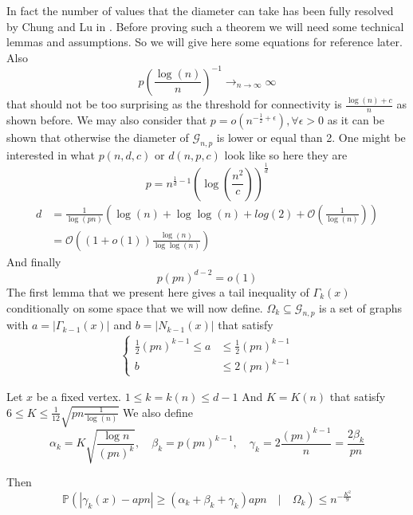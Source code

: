 In fact the number of values that the diameter can take has been fully resolved by Chung and Lu in \cite{ChungLu01}.
\newline
Before proving such a theorem we will need some technical lemmas and assumptions. So we will give here some equations for reference later.
Also 
\begin{equation}
	p (\frac{\log(n)}{n})^{-1} \longrightarrow_{n \to \infty} \infty
\end{equation}
that should not be too surprising as the threshold for connectivity is $\frac{\log(n) + c}{n}$ as shown before.
We may also consider that $p = o(n^{-\frac{1}{2} +\epsilon}), \forall \epsilon > 0$ as it can be shown that otherwise the diameter of $\mathcal{G}_{n,p}$ is lower or equal than 2. One might be interested in what $p(n, d, c)$ or $d(n , p, c)$ look like so here they are
\begin{equation}
	p=n^{\frac{1}{d} - 1}(\log(\frac{n^2}{c}))^\frac{1}{d}
\end{equation}
\begin{align}\label{eq:pnd}
	d &= \frac{1}{\log(pn)}(\log(n) + \log \log (n) + log(2) + \mathcal{O}(\frac{1}{\log(n)}))\\
	  &= \mathcal{O}((1+o(1))\frac{\log(n)}{\log\log(n)})
\end{align}
And finally
\begin{equation}
	p(pn)^{d-2} = o(1)
\end{equation}
The first lemma that we present here gives a tail inequality of $\Gamma_k(x)$ conditionally on some space that we will now define. $\Omega_k \subseteq \mathcal{G}_{n, p}$ is a set of graphs with $a = |\Gamma_{k-1}(x)|$ and $b = |N_{k-1}(x)|$ that satisfy
\begin{align}
 \left\{\begin{array}{rl}
		 \frac{1}{2}(pn)^{k-1} \leq a &\leq \frac{1}{2}(pn)^{k-1} \\
		 			    b &\leq 2(pn)^{k-1}
	 \end{array}
	\right.
\end{align}
\begin{lemma}
	Let $x$ be a fixed vertex.
	\newline
	$1 \leq k = k(n)  \leq d-1$
	\newline
	And $ K = K(n)$ that satisfy $ 6 \leq K \leq \frac{1}{12} \sqrt{pn\frac{1}{\log(n)}}$
	We also define
	\begin{equation}
		\alpha_k = K\sqrt{\frac{\log{n}}{(pn)^k}} , \quad \beta_k = p(pn)^{k-1}, \quad \gamma_k = 2\frac{(pn)^{k-1}}{n} = \frac{2\beta_k}{pn}
	\end{equation}

	Then
	\begin{equation}
		\mathbb{P}(|\gamma_k(x) - apn| \geq (\alpha_k + \beta_k + \gamma_k)apn \quad|\quad \Omega_k) \leq n^{-\frac{K^2}{9}}
	\end{equation}
\end{lemma}

